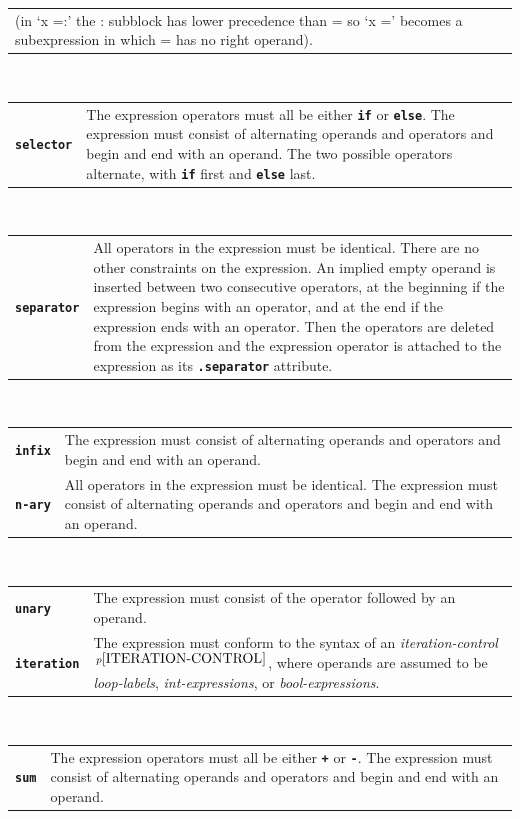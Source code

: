 \documentclass[12pt]{article}
\newcommand{\TT}[1]{{\tt \bfseries #1}}
\newcommand{\ttkey}[1]{{\tt \bfseries #1}}
\newcommand{\pagnote}[1]{$\,^{p\pageref{#1}}$}
\begin{document}
\begin{center}
\begin{tabular}{p{1in}p{5.0in}}
      (in `x =:' the : subblock has lower precedence than =
      so `x =' becomes a subexpression in which = has no right operand).
\end{tabular}
\\[0.5ex]
\begin{tabular}{p{1in}p{5.0in}}
\ttkey{selector}
    & The expression operators must all be either \TT{if} or \TT{else}.
      The expression must consist of alternating operands
      and operators and begin and end with an operand.
      The two possible operators alternate, with \TT{if} first
      and \TT{else} last.
\end{tabular}
\\[0.5ex]
\begin{tabular}{p{1in}p{5.0in}}
\ttkey{separator}\label{SEPARATOR-FORMAT}
    & All operators in the expression must be identical.
      There are no other constraints on the expression.  An implied empty
      operand is inserted between two consecutive operators,
      at the beginning if the expression begins with an operator,
      and at the end if the expression ends with an operator.
      Then the operators are deleted from the expression and
      the expression operator is attached
      to the expression as its \TT{.separator} attribute.
\end{tabular}
\\[0.5ex]
\begin{tabular}{p{1in}p{5.0in}}
\ttkey{infix}
    & The expression must consist of alternating operands
      and operators and begin and end with an operand.
\\[1ex]
\ttkey{n-ary}
    & All operators in the expression must be identical.
      The expression must consist of alternating operands
      and operators and begin and end with an operand.
\end{tabular}
\\[0.5ex]
\begin{tabular}{p{1in}p{5.0in}}
\ttkey{unary}
    & The expression must consist of
      the operator followed by an operand.
\\[1ex]
\ttkey{iteration}
    & The expression must conform to the syntax of
      an {\em iteration-control}\pagnote{ITERATION-CONTROL},
      where operands are assumed to be {\em loop-labels},
      {\em int-expressions}, or {\em bool-expressions}.
\end{tabular}
\\[0.5ex]
\begin{tabular}{p{1in}p{5.0in}}
\ttkey{sum}
    & The expression operators must all be either \TT{+} or \TT{-}.
      The expression must consist of alternating operands
      and operators and begin and end with an operand.
\end{tabular}
\end{center}
\end{document}
